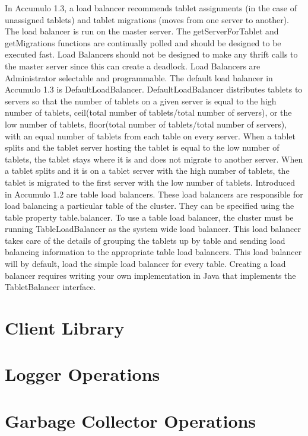 \documentclass[letterpaper,onecolumn,12pt,titlepage]{article}
\begin{document}
In Accumulo 1.3, a load balancer recommends tablet assignments (in the case of unassigned tablets) and tablet migrations (moves from one server to another).
The load balancer is run on the master server.
The getServerForTablet and getMigrations functions are continually polled and should be designed to be executed fast.
Load Balancers should not be designed to make any thrift calls to the master server since this can create a deadlock.
Load Balancers are Administrator selectable and programmable.
The default load balancer in Accumulo 1.3 is DefaultLoadBalancer.
DefaultLoadBalancer distributes tablets to servers so that the number of tablets on a given server is equal to the high number of tablets, ceil(total number of tablets/total number of servers), or the low number of tablets, floor(total number of tablets/total number of servers), with an equal number of tablets from each table on every server.
When a tablet splits and the tablet server hosting the tablet is equal to the low number of tablets, the tablet stays where it is and does not migrate to another server.
When a tablet splits and it is on a tablet server with the high number of tablets, the tablet is migrated to the first server with the low number of tablets.
Introduced in Accumulo 1.2 are table load balancers.
These load balancers are responsible for load balancing a particular table of the cluster.
They can be specified using the table property table.balancer.
To use a table load balancer, the cluster must be running TableLoadBalancer as the system wide load balancer.
This load balancer takes care of the details of grouping the tablets up by table and sending load balancing information to the appropriate table load balancers.
This load balancer will by default, load the simple load balancer for every table.
Creating a load balancer requires writing your own implementation in Java that implements the TabletBalancer interface.


\section{Client Library}
\section{Logger Operations}
\section{Garbage Collector Operations}
\end{document}
